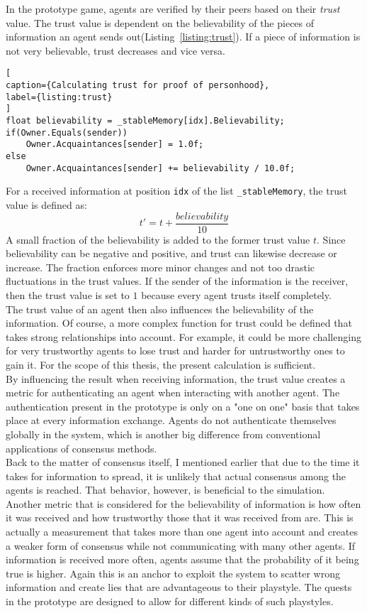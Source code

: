 In the prototype game, agents are verified by their peers based on their \textit{trust} value. The trust value is dependent on the believability of the pieces of information an agent sends out(Listing~\ref{listing:trust}). If a piece of information is not very believable, trust decreases and vice versa.
\begin{lstlisting}[
caption={Calculating trust for proof of personhood},
label={listing:trust}
]
float believability = _stableMemory[idx].Believability;
if(Owner.Equals(sender))
	Owner.Acquaintances[sender] = 1.0f;
else
	Owner.Acquaintances[sender] += believability / 10.0f;
\end{lstlisting}
For a received information at position \verb|idx| of the list \verb|_stableMemory|, the trust value is defined as:
\begin{equation}
t' = t + \frac{believability}{10}
\end{equation}
A small fraction of the believability is added to the former trust value $t$. Since believability can be negative and positive, and trust can likewise decrease or increase. The fraction enforces more minor changes and not too drastic fluctuations in the trust values. If the sender of the information is the receiver, then the trust value is set to $1$ because every agent trusts itself completely.\\
The trust value of an agent then also influences the believability of the information. Of course, a more complex function for trust could be defined that takes strong relationships into account. For example, it could be more challenging for very trustworthy agents to lose trust and harder for untrustworthy ones to gain it. For the scope of this thesis, the present calculation is sufficient.\\
By influencing the result when receiving information, the trust value creates a metric for authenticating an agent when interacting with another agent. The authentication present in the prototype is only on a "one on one" basis that takes place at every information exchange. Agents do not authenticate themselves globally in the system, which is another big difference from conventional applications of consensus methods.\\
Back to the matter of consensus itself, I mentioned earlier that due to the time it takes for information to spread, it is unlikely that actual consensus among the agents is reached. That behavior, however, is beneficial to the simulation.\\
Another metric that is considered for the believability of information is how often it was received and how trustworthy those that it was received from are. This is actually a measurement that takes more than one agent into account and creates a weaker form of consensus while not communicating with many other agents. If information is received more often, agents assume that the probability of it being true is higher. Again this is an anchor to exploit the system to scatter wrong information and create lies that are advantageous to their playstyle. The quests in the prototype are designed to allow for different kinds of such playstyles.
